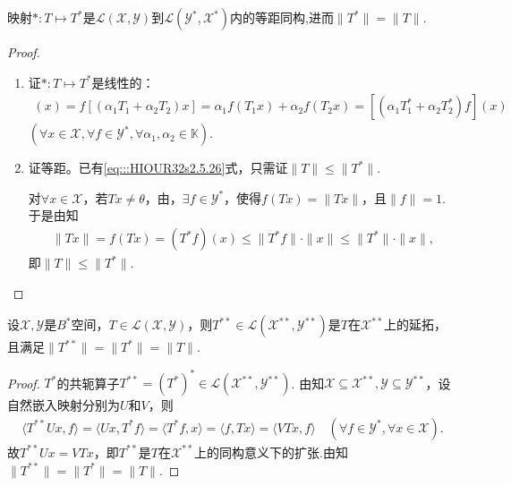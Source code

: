 \documentclass[../../main.tex]{subfiles}%
\begin{document}
\begin{theorem}\label{theorem:泛函分析--等距同构基本定理}
映射$*:T\mapsto T^*$是$\mathscr{L}(\mathscr{X},\mathscr{Y})$到$\mathscr{L}(\mathscr{Y}^*,\mathscr{X}^*)$内的等距同构,进而$\|T^{*}\|=\|T\|$.
\end{theorem}
\begin{proof}
\begin{enumerate}[(1)]
\item 证$*:T\mapsto T^*$是线性的：
\begin{align*}
[(\alpha_1T_1+\alpha_2T_2)^*f](x)=f[(\alpha_1T_1+\alpha_2T_2)x]
=\alpha_1f(T_1x)+\alpha_2f(T_2x)=[(\alpha_1T_1^*+\alpha_2T_2^*)f](x)
\end{align*}
$(\forall x\in\mathscr{X},\forall f\in\mathscr{Y}^*,\forall\alpha_1,\alpha_2\in\mathbb{K})$.

\item 证等距。已有\eqref{eq:::HIOUR32s2.5.26}式，只需证$\|T\|\leqslant\|T^*\|$.

对$\forall x\in\mathscr{X}$，若$Tx\neq\theta$，由，$\exists f\in\mathscr{Y}^*$，使得$f(Tx)=\|Tx\|$，且$\|f\|=1$. 于是由知
\begin{align*}
\|Tx\|=f(Tx)=(T^*f)(x)\leqslant\|T^*f\|\cdot\|x\|\leqslant\|T^*\|\cdot\|x\|,
\end{align*}
即$\|T\|\leqslant\|T^*\|$.
\end{enumerate}
\end{proof}

\begin{theorem}
设$\mathscr{X},\mathscr{Y}$是$B^*$空间，$T\in\mathscr{L}(\mathscr{X},\mathscr{Y})$，则$T^{**}\in\mathscr{L}(\mathscr{X}^{**},\mathscr{Y}^{**})$是$T$在$\mathscr{X}^{**}$上的延拓，且满足$\|T^{**}\|=\|T^{*}\|=\|T\|$.
\end{theorem}
\begin{proof}
$T^*$的共轭算子$T^{**}=(T^*)^*\in\mathscr{L}(\mathscr{X}^{**},\mathscr{Y}^{**})$. 由知$\mathscr{X}\subseteq\mathscr{X}^{**},\mathscr{Y}\subseteq\mathscr{Y}^{**}$，设自然嵌入映射分别为$U$和$V$，则
\begin{align*}
\langle T^{**}Ux,f\rangle=\langle Ux,T^*f\rangle
=\langle T^*f,x\rangle=\langle f,Tx\rangle
=\langle VTx,f\rangle\quad (\forall f\in\mathscr{Y}^*,\forall x\in\mathscr{X}).
\end{align*}
故$T^{**}Ux=VTx$，即$T^{**}$是$T$在$\mathscr{X}^{**}$上的同构意义下的扩张.由知$\|T^{**}\|=\|T^*\|=\|T\|$.
\end{proof}
\end{document}
